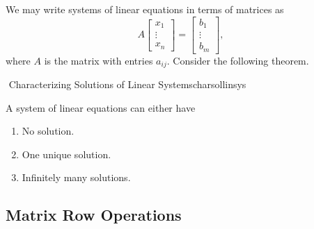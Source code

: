         We may write systems of linear equations in terms of matrices as
        \begin{equation*}
            A\begin{bmatrix} x_1 \\ \vdots \\ x_n \end{bmatrix}=\begin{bmatrix} b_1 \\ \vdots \\ b_m \end{bmatrix},
        \end{equation*}
        where \(A\) is the matrix with entries \(a_{ij}\). Consider the following theorem.
        \begin{theorem}{\Stop\,\,Characterizing Solutions of Linear Systems}{charsollinsys}
            
            A system of linear equations can either have
            \begin{enumerate}
                \item No solution.
                \item One unique solution.
                \item Infinitely many solutions.
            \end{enumerate}
            
        \end{theorem}

    \subsection{Matrix Row Operations}
    
